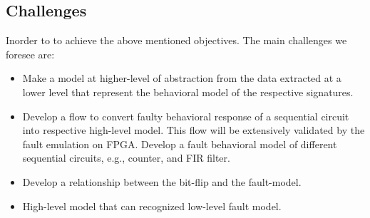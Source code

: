 \begin{itemize}
%
%
%
%
%





\end{itemize}




\subsection{Challenges}
Inorder to to achieve the above mentioned objectives. The main challenges we foresee are:
\begin{itemize}

\item Make a model at higher-level of abstraction from the data extracted at a lower level that represent the behavioral model of the respective signatures.
\item Develop a flow to convert faulty behavioral response of a sequential circuit into respective high-level model. This flow will be extensively validated by the fault emulation on FPGA. Develop a  fault behavioral model of different sequential circuits, e.g., counter, and FIR filter.

\item Develop a relationship between the bit-flip and the fault-model.

\item High-level model that can recognized low-level fault model.

\end{itemize}


